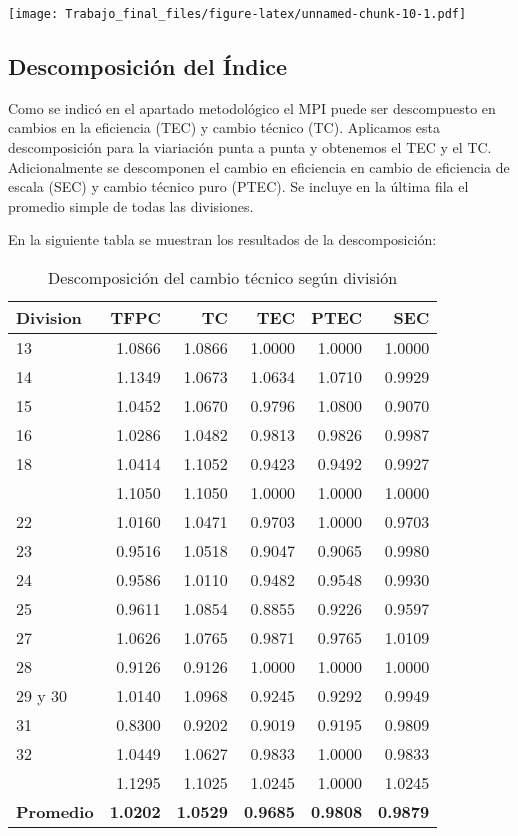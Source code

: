 \documentclass[
]{article}
\begin{document}
\texttt{[image: Trabajo\_final\_files/figure-latex/unnamed-chunk-10-1.pdf]}

\hypertarget{descomposiciuxf3n-del-uxedndice}{%
\subsection{Descomposición del
Índice}\label{descomposiciuxf3n-del-uxedndice}}

Como se indicó en el apartado metodológico el MPI puede ser descompuesto
en cambios en la eficiencia (TEC) y cambio técnico (TC). Aplicamos esta
descomposición para la viariación punta a punta y obtenemos el TEC y el
TC. Adicionalmente se descomponen el cambio en eficiencia en cambio de
eficiencia de escala (SEC) y cambio técnico puro (PTEC). Se incluye en
la última fila el promedio simple de todas las divisiones.

En la siguiente tabla se muestran los resultados de la descomposición:

\begin{table}[H]

\caption{\label{tab:unnamed-chunk-11}Descomposición del cambio técnico según división}
\centering
\begin{tabular}[t]{lrrrrr}
\toprule
Division & TFPC & TC & TEC & PTEC & SEC\\
\midrule
\rowcolor{gray!6}  13 & 1.0866 & 1.0866 & 1.0000 & 1.0000 & 1.0000\\
14 & 1.1349 & 1.0673 & 1.0634 & 1.0710 & 0.9929\\
\rowcolor{gray!6}  15 & 1.0452 & 1.0670 & 0.9796 & 1.0800 & 0.9070\\
16 & 1.0286 & 1.0482 & 0.9813 & 0.9826 & 0.9987\\
\rowcolor{gray!6}  18 & 1.0414 & 1.1052 & 0.9423 & 0.9492 & 0.9927\\
\addlinespace
21 & 1.1050 & 1.1050 & 1.0000 & 1.0000 & 1.0000\\
\rowcolor{gray!6}  22 & 1.0160 & 1.0471 & 0.9703 & 1.0000 & 0.9703\\
23 & 0.9516 & 1.0518 & 0.9047 & 0.9065 & 0.9980\\
\rowcolor{gray!6}  24 & 0.9586 & 1.0110 & 0.9482 & 0.9548 & 0.9930\\
25 & 0.9611 & 1.0854 & 0.8855 & 0.9226 & 0.9597\\
\addlinespace
\rowcolor{gray!6}  27 & 1.0626 & 1.0765 & 0.9871 & 0.9765 & 1.0109\\
28 & 0.9126 & 0.9126 & 1.0000 & 1.0000 & 1.0000\\
\rowcolor{gray!6}  29 y 30 & 1.0140 & 1.0968 & 0.9245 & 0.9292 & 0.9949\\
31 & 0.8300 & 0.9202 & 0.9019 & 0.9195 & 0.9809\\
\rowcolor{gray!6}  32 & 1.0449 & 1.0627 & 0.9833 & 1.0000 & 0.9833\\
\addlinespace
33 & 1.1295 & 1.1025 & 1.0245 & 1.0000 & 1.0245\\
\rowcolor{gray!6}  \textbf{Promedio} & \textbf{1.0202} & \textbf{1.0529} & \textbf{0.9685} & \textbf{0.9808} & \textbf{0.9879}\\
\bottomrule
\end{tabular}
\end{table}
\end{document}
